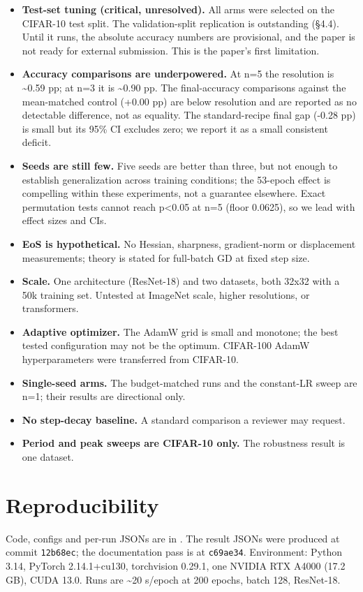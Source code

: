 \documentclass[11pt,a4paper]{article}
\begin{document}
\begin{itemize}
\item \textbf{Test-set tuning (critical, unresolved).} All arms were selected on the CIFAR-10 test split. The validation-split replication is outstanding (\S{}4.4). Until it runs, the absolute accuracy numbers are provisional, and the paper is not ready for external submission. This is the paper's first limitation.
\item \textbf{Accuracy comparisons are underpowered.} At n=5 the resolution is \textasciitilde{}0.59 pp; at n=3 it is \textasciitilde{}0.90 pp. The final-accuracy comparisons against the mean-matched control (+0.00 pp) are below resolution and are reported as no detectable difference, not as equality. The standard-recipe final gap (-0.28 pp) is small but its 95\% CI excludes zero; we report it as a small consistent deficit.
\item \textbf{Seeds are still few.} Five seeds are better than three, but not enough to establish generalization across training conditions; the 53-epoch effect is compelling within these experiments, not a guarantee elsewhere. Exact permutation tests cannot reach p<0.05 at n=5 (floor 0.0625), so we lead with effect sizes and CIs.
\item \textbf{EoS is hypothetical.} No Hessian, sharpness, gradient-norm or displacement measurements; theory is stated for full-batch GD at fixed step size.
\item \textbf{Scale.} One architecture (ResNet-18) and two datasets, both 32x32 with a 50k training set. Untested at ImageNet scale, higher resolutions, or transformers.
\item \textbf{Adaptive optimizer.} The AdamW grid is small and monotone; the best tested configuration may not be the optimum. CIFAR-100 AdamW hyperparameters were transferred from CIFAR-10.
\item \textbf{Single-seed arms.} The budget-matched runs and the constant-LR sweep are n=1; their results are directional only.
\item \textbf{No step-decay baseline.} A standard comparison a reviewer may request.
\item \textbf{Period and peak sweeps are CIFAR-10 only.} The robustness result is one dataset.
\end{itemize}

\section{Reproducibility}
Code, configs and per-run JSONs are in . The result JSONs were produced at commit \texttt{12b68ec}; the documentation pass is at \texttt{c69ae34}. Environment: Python 3.14, PyTorch 2.14.1+cu130, torchvision 0.29.1, one NVIDIA RTX A4000 (17.2 GB), CUDA 13.0. Runs are \textasciitilde{}20 s/epoch at 200 epochs, batch 128, ResNet-18.
\end{document}
